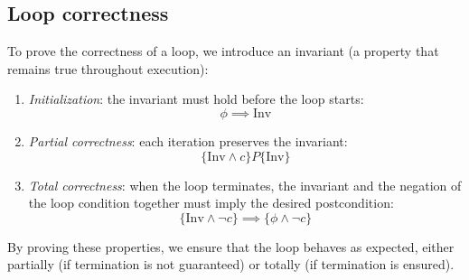 \subsection{Loop correctness}
To prove the correctness of a loop, we introduce an invariant (a property that remains true throughout execution): 
\begin{enumerate}
    \item \textit{Initialization}: the invariant must hold before the loop starts:
        \[\phi\implies\text{Inv}\]
    \item \textit{Partial correctness}: each iteration preserves the invariant:
        \[\{ \text{Inv} \land c \} P \{ \text{Inv} \}\]
    \item \textit{Total correctness}: when the loop terminates, the invariant and the negation of the loop condition together must imply the desired postcondition:
        \[\{ \text{Inv} \land \lnot c \} \implies \{ \phi\land\lnot c \}\]
\end{enumerate}
\noindent By proving these properties, we ensure that the loop behaves as expected, either partially (if termination is not guaranteed) or totally (if termination is ensured).